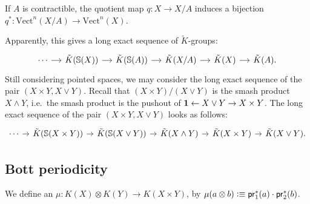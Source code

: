 \documentclass{article}
\begin{document}
\begin{lem}
If $A$ is contractible, the quotient map $q:X\to X/A$ induces a bijection
$q^\ast:\mathrm{Vect}^n(X/A)\to\mathrm{Vect}^n(X)$.
\end{lem}

Apparently, this gives a long exact sequence of $\tilde{K}$-groups:
\begin{equation*}
\begin{tikzcd}[column sep=small]
\cdots\arrow[r] & \tilde{K}(\Sn(X)) \arrow[r] & \tilde{K}(\Sn(A)) \arrow[r]
& \tilde{K}(X/A) \arrow[r] & \tilde{K}(X) \arrow[r] & \tilde{K}(A).
\end{tikzcd}
\end{equation*}
Still considering pointed spaces, we may consider the long exact sequence of the pair $(X\times Y,
X\vee Y)$. Recall that $(X\times Y)/(X\vee Y)$ is the smash product
$X\wedge Y$, i.e.~the smash product is the pushout of $\mathbf{1}\leftarrow
X\vee Y\rightarrow X\times Y$. The long exact sequence of the pair
$(X\times Y,X\vee Y)$ looks as follows:
\begin{equation*}
\begin{tikzcd}[column sep=.8em]
\cdots\arrow[r] & \tilde{K}(\Sn(X\times Y)) \arrow[r] & \tilde{K}(\Sn(X\vee Y)) \arrow[r]
& \tilde{K}(X\wedge Y) \arrow[r] & \tilde{K}(X\times Y) \arrow[r] & \tilde{K}(X\vee Y).
\end{tikzcd}
\end{equation*}  

\subsection{Bott periodicity}

\begin{defn}
We define an  $\mu:K(X)\otimes K(Y)\to K(X\times Y)$,
by $\mu(a\otimes b)\vcentcolon\equiv \mathsf{pr}_{1}^\ast(a)\cdot\mathsf{pr}_{2}^\ast(b)$. 
\end{defn}
\end{document}
